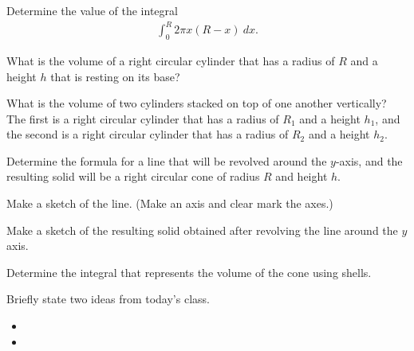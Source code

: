 \begin{problem}
\item Determine the value of the integral
  \begin{eqnarray*}
    \int^R_0 2\pi x \left( R-x \right) ~ dx.
  \end{eqnarray*}
  \vfill

\item What is the volume of a right circular cylinder that has a
  radius of $R$ and a height $h$ that is resting on its base?

  \vfill

\item What is the volume of two cylinders stacked on top of one
  another vertically? The first is a right circular cylinder that has a radius of
  $R_1$ and a height $h_1$, and the second is a right circular cylinder that
  has a radius of $R_2$ and a height $h_2$.

  \vfill

\end{problem}


\begin{problem}
\item Determine the formula for a line that will be revolved
      around the $y$-axis, and the resulting solid will be a right
      circular cone of radius $R$ and height $h$.
  \begin{subproblem}
    \item Make a sketch of the line. (Make an axis and clear mark the
      axes.)
      \vfill

    \item Make a sketch of the resulting solid obtained after
      revolving the line around the $y$ axis.
      \vfill

    \item Determine the integral that represents the volume of the
      cone using shells.
      \vfill

  \end{subproblem}
\end{problem}

\postClass

\begin{problem}
\item Briefly state two ideas from today's class.
  \begin{itemize}
  \item
  \item
  \end{itemize}
\item
  \begin{subproblem}
    \item
  \end{subproblem}
\end{problem}



